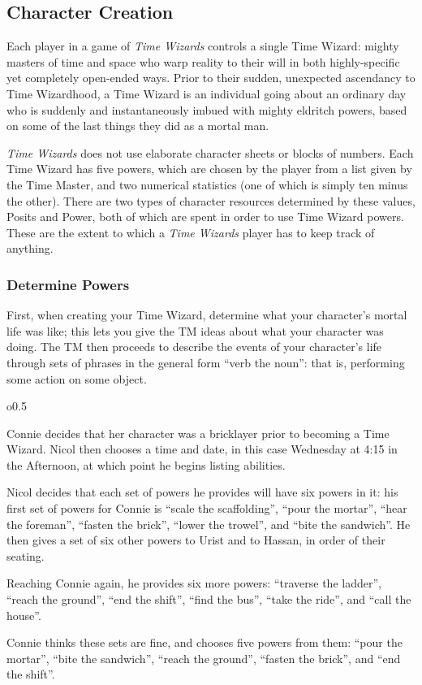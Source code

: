 \documentclass[twoside]{article}
\newcommand{\tw}{\emph{Time Wizards}}
\newenvironment{examplebox}[1]{\begin{tcolorbox}[colback=green!5!white,colframe=green!75!black,title={Example: #1}]}{\end{tcolorbox}\vspace{-30pt}}
\begin{document}
\subsection{Character Creation} \label{ssec:creation}
Each player in a game of \tw{} controls a single Time Wizard: mighty masters of time and space
who warp reality to their will in both highly-specific yet completely open-ended ways. Prior to
their sudden, unexpected ascendancy to Time Wizardhood, a Time Wizard is an individual going
about an ordinary day who is suddenly and instantaneously imbued with mighty eldritch powers,
based on some of the last things they did as a mortal man.

\tw{} does not use elaborate character sheets or blocks of numbers. Each Time Wizard has five
powers, which are chosen by the player from a list given by the Time Master, and two numerical
statistics (one of which is simply ten minus the other). There are two types of character
resources determined by these values, Posits and Power, both of which are spent in order to use
Time Wizard powers. These are the extent to which a \tw{} player has to keep track of anything.

\subsubsection{Determine Powers} \label{ssec:get-powers}
First, when creating your Time Wizard, determine what your character's mortal life was like;
this lets you give the TM ideas about what your character was doing. The TM then proceeds to
describe the events of your character's life through sets of phrases in the general form
``verb the noun'': that is, performing some action on some object.

\begin{wrapfigure}{o}{0.5\textwidth}
   \vspace{-25pt}
   \begin{examplebox}{Determining Powers}
      Connie decides that her character was a bricklayer prior to becoming a Time Wizard. Nicol
      then chooses a time and date, in this case Wednesday at 4:15 in the Afternoon, at which
      point he begins listing abilities.

      Nicol decides that each set of powers he provides will have six powers in it: his first
      set of powers for Connie is ``scale the scaffolding'', ``pour the mortar'', ``hear the
      foreman'', ``fasten the brick'', ``lower the trowel'', and ``bite the sandwich''. He
      then gives a set of six other powers to Urist and to Hassan, in order of their seating.

      Reaching Connie again, he provides six more powers: ``traverse the ladder'', ``reach the
      ground'', ``end the shift'', ``find the bus'', ``take the ride'', and ``call the house''.

      Connie thinks these sets are fine, and chooses five powers from them: ``pour the mortar'',
      ``bite the sandwich'', ``reach the ground'', ``fasten the brick'', and ``end the shift''.
   \end{examplebox}
\end{wrapfigure}
\end{document}
